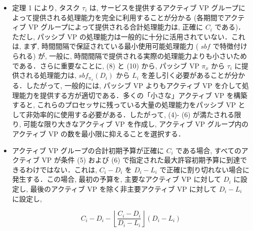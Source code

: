 \begin{frame}{}
    \begin{itemize}
        \item 定理 1 により, タスク $\tau_{i}$ は, サービスを提供するアクティブ VP グループによって提供される処理能力を完全に利用することが分かる (各期間でアクティブ VP グループによって提供される合計処理能力は, 正確に $C_{i}$ である)．ただし, パッシブ VP の処理能力は一般的に十分に活用されていない．これは, まず, 時間間隔で保証されている最小使用可能処理能力 ( $s b f$ で特徴付けられる) が, 一般に, 時間間隔で提供される実際の処理能力よりも小さいためである．さらに重要なことに, (8) と (10) から, パッシブ VP $\pi_{x}$ から $\tau_{i}$ に提供される処理能力は, $s b f_{\pi_{x}}\left(D_{i}\right)$ から $L_{i}$ を差し引く必要があることが分かる．したがって, 一般的には, パッシブ VP よりもアクティブ VP を介して処理能力を提供する方が適切である．多くの「小さな」アクティブ VP を構築すると, これらのプロセッサに残っている大量の処理能力をパッシブ VP として非効率的に使用する必要がある．したがって, (4)- (6) が満たされる限り, 可能な限り大きなアクティブ VP を作成し, アクティブ VP グループ内のアクティブ VP の数を最小限に抑えることを選択する．
    \end{itemize}
\end{frame}

\begin{frame}{}
    \begin{itemize}
        \item アクティブ VP グループの合計初期予算が正確に $C_{i}$ である場合, すべてのアクティブ VP が条件 (5) および (6) で指定された最大許容初期予算に到達できるわけではない．これは, $C_{i}-D_{i}$ を $D_{i}-L_{i}$ で正確に割り切れない場合に発生する．この場合, 最初の予算を, 主要なアクティブ VP に対して $D_{i}$ に設定し, 最後のアクティブ VP を除く非主要アクティブ VP に対して $D_{i}-L_{i}$ に設定し,

              \begin{equation*}
                  C_{i}-D_{i}-\left\lfloor\frac{C_{i}-D_{i}}{D_{i}-L_{i}}\right\rfloor\left(D_{i}-L_{i}\right)
              \end{equation*}
    \end{itemize}
\end{frame}

